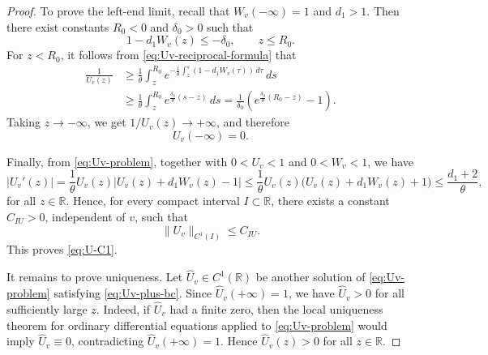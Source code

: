 \documentclass[preprint,sort&compress,final,12pt]{elsarticle}
\numberwithin{equation}{section}
\begin{document}
\begin{proof}
To prove the left-end limit, recall that $W_v(-\infty)=1$ and $d_1>1$. Then there exist constants $R_0<0$ and $\delta_0>0$ such that
\begin{equation*}
1-d_1W_v(z)\le-\delta_0,\qquad z\le R_0.
\end{equation*}
For $z<R_0$, it follows from \eqref{eq:Uv-reciprocal-formula} that
\begin{align*}
\frac{1}{U_v(z)}
&\ge\frac{1}{\theta}\int_z^{R_0}e^{-\frac{1}{\theta}\int_z^s(1-d_1W_v(\tau))\,d\tau}\,ds\\
&\ge\frac{1}{\theta}\int_z^{R_0}e^{\frac{\delta_0}{\theta}(s-z)}\,ds
=\frac{1}{\delta_0}\left(e^{\frac{\delta_0}{\theta}(R_0-z)}-1\right).
\end{align*}
Taking $z\to-\infty$, we get $1/U_v(z)\to+\infty$, and therefore
\begin{equation*}
U_v(-\infty)=0.
\end{equation*}

Finally, from \eqref{eq:Uv-problem}, together with $0<U_v<1$ and $0<W_v<1$, we have
\begin{equation*}
|U_v'(z)|
=\frac{1}{\theta}U_v(z)|U_v(z)+d_1W_v(z)-1|
\le\frac{1}{\theta}U_v(z)\bigl(U_v(z)+d_1W_v(z)+1\bigr)
\le\frac{d_1+2}{\theta},
\end{equation*}
for all $z\in\mathbb R$. Hence, for every compact interval $I\subset\mathbb R$, there exists a constant $C_{IU}>0$, independent of $v$, such that
\begin{equation*}
\|U_v\|_{C^1(I)}\le C_{IU}.
\end{equation*}
This proves \eqref{eq:U-C1}.

It remains to prove uniqueness. Let $\widehat U_v\in C^1(\mathbb R)$ be another solution of \eqref{eq:Uv-problem} satisfying \eqref{eq:Uv-plus-bc}. Since $\widehat U_v(+\infty)=1$, we have $\widehat U_v>0$ for all sufficiently large $z$. Indeed, if $\widehat U_v$ had a finite zero, then the local uniqueness theorem for ordinary differential equations applied to \eqref{eq:Uv-problem} would imply $\widehat U_v\equiv0$, contradicting $\widehat U_v(+\infty)=1$. Hence $\widehat U_v(z)>0$ for all $z\in\mathbb R$.


\end{proof}
\end{document}
